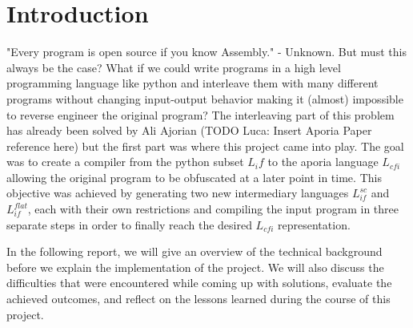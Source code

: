 \section{Introduction}

"Every program is open source if you know Assembly." - Unknown. But must this always be the case? What if we could write programs in a high level programming language like python and
interleave them with many different programs without changing input-output behavior making it (almost) impossible to reverse engineer the original program? The interleaving part of this problem has already been 
solved by Ali Ajorian (TODO Luca: Insert Aporia Paper reference here) but the first part was where this project came into play.
The goal was to create a compiler from the python subset $L_if$ to the aporia language $L_{cfi}$ allowing the original program to be obfuscated at a later point in time.
This objective was achieved by generating two new intermediary languages $L_{if}^{sc}$ and $L_{if}^{flat}$, each with their own restrictions and compiling the input program 
in three separate steps in order to finally reach the desired $L_{cfi}$ representation.


In the following report, we will give an overview of the technical background before we explain the implementation of the project. We will also discuss the difficulties that were 
encountered while coming up with solutions, evaluate the achieved outcomes, and reflect on the lessons learned during the course of this project.